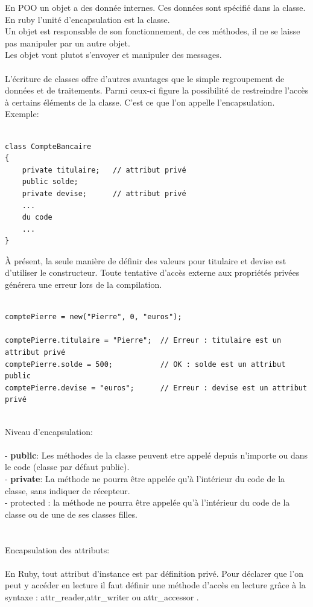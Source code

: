 \documentclass[a4paper,12pt,openany]{book}
\begin{document}
En POO un objet a des donnée internes. Ces données sont spécifié dans la classe.\\
En ruby l'unité d'encapsulation est la classe.\\
Un objet est responsable de son fonctionnement, de ces méthodes, il ne se laisse pas manipuler par un autre objet.\\
Les objet vont plutot s'envoyer et manipuler des messages.\\
\\
L'écriture de classes offre d'autres avantages que le simple regroupement de données et de traitements. Parmi ceux-ci figure la possibilité de restreindre l'accès à certains éléments de la classe. C'est ce que l'on appelle l'encapsulation.\\
Exemple:\\
\\
\begin{verbatim}
class CompteBancaire
{
    private titulaire;   // attribut privé
    public solde;
    private devise;      // attribut privé
    ...
    du code
    ...
}
\end{verbatim}

À présent, la seule manière de définir des valeurs pour titulaire et devise est d'utiliser le constructeur. Toute tentative d'accès externe aux propriétés privées générera une erreur lors de la compilation.\\
\\
\begin{verbatim}
comptePierre = new("Pierre", 0, "euros");

comptePierre.titulaire = "Pierre";  // Erreur : titulaire est un attribut privé
comptePierre.solde = 500;           // OK : solde est un attribut public
comptePierre.devise = "euros";      // Erreur : devise est un attribut privé
\end{verbatim}
\\
Niveau d'encapsulation:\\
\\
- \textbf{public}: Les méthodes de la classe peuvent etre appelé depuis n'importe ou dans le code (classe par défaut public).\\
- \textbf{private}: La méthode ne pourra être appelée qu’à l’intérieur du code de la classe, sans indiquer de récepteur.\\
- protected : la méthode ne pourra être appelée qu’à l’intérieur du code de la classe ou de une de ses classes filles.\\
\\
\\
Encapsulation des attributs:\\
\\
En Ruby, tout attribut d’instance est par définition privé. Pour déclarer que l’on peut y accéder en lecture il faut définir une méthode d’accès en lecture grâce à la syntaxe : attr\_reader,attr\_writer ou  attr\_accessor . \\
\end{document}
